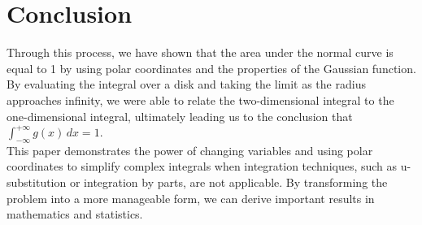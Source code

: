 \documentclass{article}
\begin{document}
\section{Conclusion}

Through this process, we have shown that the area under the normal curve is equal to 1 by using polar coordinates and the properties of the Gaussian function. By evaluating the integral over a disk and taking the limit as the radius approaches infinity, we were able to relate the two-dimensional integral to the one-dimensional integral, ultimately leading us to the conclusion that \(\int_{-\infty}^{+\infty} g(x) \, dx = 1\). \\

This paper demonstrates the power of changing variables and using polar coordinates to simplify complex integrals when integration techniques, such as u-substitution or integration by parts, are not applicable. By transforming the problem into a more manageable form, we can derive important results in mathematics and statistics.
\end{document}
